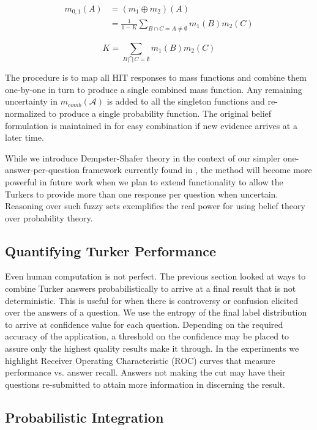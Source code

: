 \begin{equation}
\begin{split}
m_{0,1}(A) &=(m_{1}\oplus m_{2})(A)\\
                   &=\frac{1}{1-K} \sum_{B\cap C=A\neq\emptyset} m_{1}(B)m_{2}(C)
\end{split}
\end{equation}

\begin{equation}
K=\sum_{B\bigcap C=\emptyset}m_{1}(B)m_{2}(C)
\end{equation}

The procedure is to map all HIT responses to mass functions and combine them one-by-one in turn to produce a single combined mass function.  Any remaining uncertainty in $m_{comb}(\mathcal{A})$ is added to all the singleton functions and re-normalized to produce a single probability function.  The original belief formulation is maintained in \sysName for easy combination if new evidence arrives at a later time.

While we introduce Dempster-Shafer theory in the context of our simpler one-answer-per-question framework currently found in \sysName , the method will become more powerful in future work when we plan to extend functionality to allow the Turkers to provide more than one response per question when uncertain.  Reasoning over such fuzzy sets exemplifies the real power for using belief theory over probability theory.

\subsection{Quantifying Turker Performance}

Even human computation is not perfect.  The previous section looked at ways to combine Turker answers probabilistically to arrive at a final result that is not deterministic.  This is useful for when there is controversy or confusion elicited over the answers of a question.  We use the entropy of the final label distribution to arrive at confidence value for each question.  Depending on the required accuracy of the application, a threshold on the confidence may be placed to assure only the highest quality results make it through.  In the experiments we highlight Receiver Operating Characteristic (ROC) curves that measure performance vs. answer recall.  Answers not making the cut may have their questions re-submitted to attain more information in discerning the result. 

\subsection{Probabilistic Integration}

